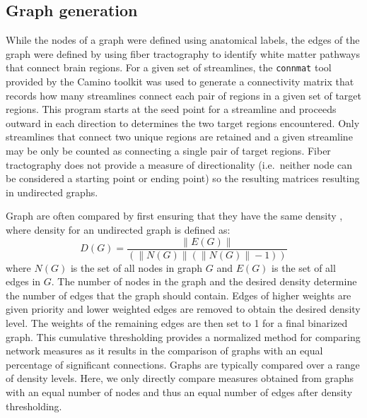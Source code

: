 \documentclass{frontiersSCNS} %
\begin{document}
\subsection{Graph generation}
While the nodes of a graph were defined using anatomical labels, the edges of the graph were defined by using
fiber tractography to identify white matter pathways that connect brain regions. 
For a given set of streamlines, the \texttt{connmat} tool provided by  the Camino toolkit was used to generate
a connectivity matrix that records how many streamlines connect each pair of
regions in a given set of target regions. This program starts at the seed point for a streamline and proceeds outward in each
direction to determines the two target regions encountered. Only streamlines that connect two unique regions are retained and
a given streamline may be only be counted as connecting a single pair of target regions. Fiber tractography does not provide a measure
of directionality (i.e.\ neither node can be considered a starting point or ending point) so the resulting matrices resulting in undirected graphs.

Graph are often compared by first ensuring that they have the same density \citep{Achard2006,Bassett2006}, where density for an undirected graph is defined as:
$$D(G) = \frac{\|E(G)\|}{( \|N(G)\| (\|N(G)\|-1) )} $$
where $N(G)$ is the set of all nodes in graph $G$ and $E(G)$ is the set of all edges in $G$. The number of nodes in the graph and the desired density determine the number of edges that the graph should contain. Edges of higher weights are given priority and lower weighted edges are removed to obtain the desired density level. The weights of the remaining edges are then set to 1 for a final binarized graph. This cumulative thresholding provides a normalized method for comparing network measures as it results in the comparison of graphs with an equal percentage of significant connections. Graphs are typically compared over a range of density levels.  Here, we only directly compare measures obtained from graphs with an equal number of nodes and thus an equal number of edges after density thresholding.
\end{document}

